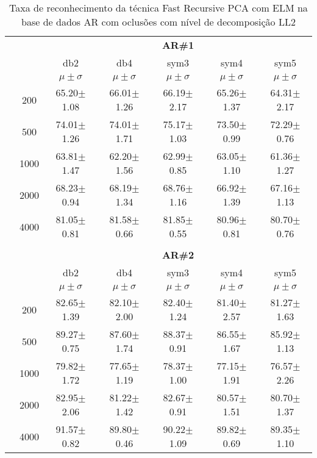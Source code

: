 \begin{table}[H]
	\centering
    \normalsize
	\caption{Taxa de reconhecimento da técnica Fast Recursive PCA com ELM na base de dados AR com oclusões com nível de decomposição LL2}
   \hspace{0.5in}
	\begin{tabular}{|c|c|c c c c c|}
\cline{3-7}
\multicolumn{2}{c|}{\multirow{3}{*}{}} & \multicolumn{5}{c|}{\textbf{AR\#1}}   \\\cline{3-7} 
\multicolumn{2}{c|}{}  & db2 & db4 & sym3 & sym4 & sym5 \\\cline{3-7}%
\multicolumn{2}{c|}{}& $\mu \pm \sigma$ & $\mu \pm \sigma$ & $\mu \pm \sigma$ & $\mu \pm \sigma$ & $\mu \pm \sigma$ \\\hline


\multicolumn{1}{|c|}{ \multirow{5}{*}{\rotatebox[origin=c]{90}{\textbf{Neurônios}}} }
&200	&65.20$\pm$1.08	&66.01$\pm$1.26	&66.19$\pm$2.17	&65.26$\pm$1.37	&64.31$\pm$2.17\\\cline{2-7}
&500	&74.01$\pm$1.26	&74.01$\pm$1.71	&75.17$\pm$1.03	&73.50$\pm$0.99	&72.29$\pm$0.76\\\cline{2-7}
&1000	&63.81$\pm$1.47	&62.20$\pm$1.56	&62.99$\pm$0.85	&63.05$\pm$1.10	&61.36$\pm$1.27\\\cline{2-7}
&2000	&68.23$\pm$0.94	&68.19$\pm$1.34	&68.76$\pm$1.16	&66.92$\pm$1.39	&67.16$\pm$1.13\\\cline{2-7}
&4000	&81.05$\pm$0.81	&81.58$\pm$0.66	&81.85$\pm$0.55 &80.96$\pm$0.81	&80.70$\pm$0.76 \\\midrule%

\multicolumn{7}{c}{}\\ 

\cline{3-7}
\multicolumn{2}{c|}{\multirow{3}{*}{}} & \multicolumn{5}{c|}{\textbf{AR\#2}}   \\\cline{3-7} 

\multicolumn{2}{c|}{}  & db2 & db4 & sym3 & sym4 & sym5 \\\cline{3-7}
\multicolumn{2}{c|}{}& $\mu \pm \sigma$ & $\mu \pm \sigma$ & $\mu \pm \sigma$ & $\mu \pm \sigma$ & $\mu \pm \sigma$ \\\hline


\multicolumn{1}{|c|}{ \multirow{5}{*}{\rotatebox[origin=c]{90}{\textbf{Neurônios}}} }
&200	&82.65$\pm$1.39	&82.10$\pm$2.00	&82.40$\pm$1.24	&81.40$\pm$2.57	&81.27$\pm$1.63\\\cline{2-7}
&500	&89.27$\pm$0.75	&87.60$\pm$1.74	&88.37$\pm$0.91	&86.55$\pm$1.67	&85.92$\pm$1.13\\\cline{2-7}
&1000	&79.82$\pm$1.72	&77.65$\pm$1.19	&78.37$\pm$1.00	&77.15$\pm$1.91	&76.57$\pm$2.26\\\cline{2-7}
&2000	&82.95$\pm$2.06	&81.22$\pm$1.42	&82.67$\pm$0.91	&80.57$\pm$1.51	&80.70$\pm$1.37\\\cline{2-7}
&4000	&91.57$\pm$0.82	&89.80$\pm$0.46	&90.22$\pm$1.09	&89.82$\pm$0.69	&89.35$\pm$1.10
	




\end{tabular}
\end{table}
